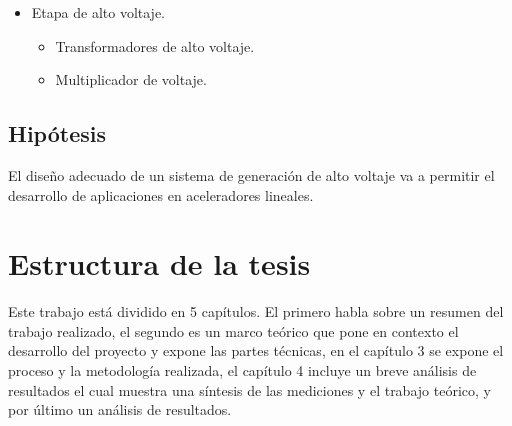\begin{itemize}
\item Etapa de alto voltaje.
\begin{itemize}
\item Transformadores de alto voltaje.
\item Multiplicador de voltaje.
\end{itemize}
\end{itemize}

\subsection{Hipótesis}
El diseño adecuado de un sistema de generación de alto voltaje va a permitir el desarrollo de aplicaciones en aceleradores lineales. 

\newpage


\section{Estructura de la tesis}

Este trabajo está dividido en 5 capítulos. El primero habla sobre un resumen del trabajo realizado, el segundo es un marco teórico que pone en contexto el desarrollo del proyecto y expone las partes técnicas, en el capítulo 3 se expone el proceso y la metodología realizada, el capítulo 4 incluye un breve análisis de resultados el cual muestra una síntesis de las mediciones y el trabajo teórico, y por último un análisis de resultados. 